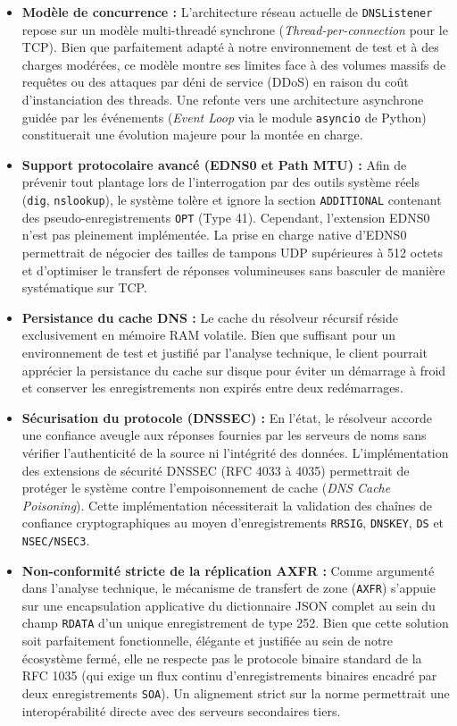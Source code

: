 \begin{itemize}
    \item \textbf{Modèle de concurrence :}
    L'architecture réseau actuelle de \texttt{DNSListener} repose sur un modèle multi-threadé synchrone (\textit{Thread-per-connection} pour le TCP). Bien que parfaitement adapté à notre environnement de test et à des charges modérées, ce modèle montre ses limites face à des volumes massifs de requêtes ou des attaques par déni de service (DDoS) en raison du coût d'instanciation des threads. Une refonte vers une architecture asynchrone guidée par les événements (\textit{Event Loop} via le module \texttt{asyncio} de Python) constituerait une évolution majeure pour la montée en charge.

    \item \textbf{Support protocolaire avancé (EDNS0 et Path MTU) :}
    Afin de prévenir tout plantage lors de l'interrogation par des outils système réels (\texttt{dig}, \texttt{nslookup}), le système tolère et ignore la section \texttt{ADDITIONAL} contenant des pseudo-enregistrements \texttt{OPT} (Type 41). Cependant, l'extension EDNS0 n'est pas pleinement implémentée. La prise en charge native d'EDNS0 permettrait de négocier des tailles de tampons UDP supérieures à 512 octets et d'optimiser le transfert de réponses volumineuses sans basculer de manière systématique sur TCP.

    \item \textbf{Persistance du cache DNS :}
    Le cache du résolveur récursif réside exclusivement en mémoire RAM volatile. Bien que suffisant pour un environnement de test et justifié par l'analyse technique, le client pourrait apprécier la persistance du cache sur disque pour éviter un démarrage à froid et conserver les enregistrements non expirés entre deux redémarrages.

    \item \textbf{Sécurisation du protocole (DNSSEC) :}
    En l'état, le résolveur accorde une confiance aveugle aux réponses fournies par les serveurs de noms sans vérifier l'authenticité de la source ni l'intégrité des données. L'implémentation des extensions de sécurité DNSSEC (RFC 4033 à 4035) permettrait de protéger le système contre l'empoisonnement de cache (\textit{DNS Cache Poisoning}). Cette implémentation nécessiterait la validation des chaînes de confiance cryptographiques au moyen d'enregistrements \texttt{RRSIG}, \texttt{DNSKEY}, \texttt{DS} et \texttt{NSEC/NSEC3}.

    \item \textbf{Non-conformité stricte de la réplication AXFR :}
    Comme argumenté dans l'analyse technique, le mécanisme de transfert de zone (\texttt{AXFR}) s'appuie sur une encapsulation applicative du dictionnaire JSON complet au sein du champ \texttt{RDATA} d'un unique enregistrement de type 252. Bien que cette solution soit parfaitement fonctionnelle, élégante et justifiée au sein de notre écosystème fermé, elle ne respecte pas le protocole binaire standard de la RFC 1035 (qui exige un flux continu d'enregistrements binaires encadré par deux enregistrements \texttt{SOA}). Un alignement strict sur la norme permettrait une interopérabilité directe avec des serveurs secondaires tiers.
\end{itemize}